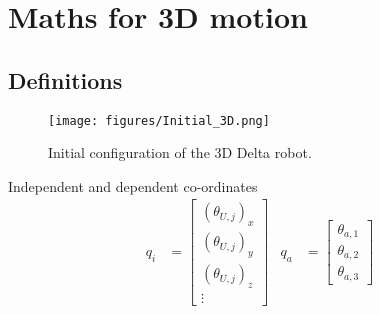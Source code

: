 \section{Maths for 3D motion}
\subsection{Definitions}
\begin{figure}[h!]
	\centering
	\texttt{[image: figures/Initial\_3D.png]}                                                              
	\caption[Initial configuration of the 3D Delta robot]{Initial configuration of the 3D Delta robot.}
	\label{fig:initia3D}
\end{figure}

Independent and dependent co-ordinates
\begin{align}
q_i&=
\begin{bmatrix}
(\theta_{U,j})_x \\
(\theta_{U,j})_y \\
(\theta_{U,j})_z \\
\vdots
\end{bmatrix} &
q_a&=
\begin{bmatrix}
\theta_{a,1} \\
\theta_{a,2} \\
\theta_{a,3}
\end{bmatrix}
\end{align}

